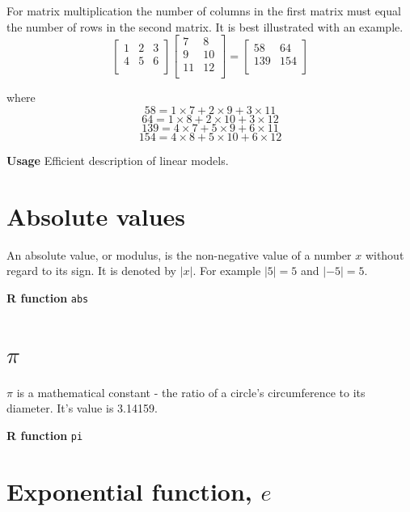 \documentclass[
  oneside]{krantz}
\begin{document}
For matrix multiplication the number of columns in the first matrix must equal the number of rows in the second matrix. It is best illustrated with an example.\\
\[
\left[\begin{array}
{ccc}
1 & 2 & 3 \\
4 & 5 & 6 \\
\end{array}\right] 
\left[\begin{array}
{cc}
7 & 8\\
9 & 10 \\
11 & 12 \\
\end{array}\right] 
= 
\left[\begin{array}
{cc}
58 & 64 \\
139 & 154 \\
\end{array}\right] 
\]

where
\[ 58 = 1 \times 7 + 2 \times 9 + 3 \times 11\]
\[ 64 = 1 \times 8 + 2 \times 10 + 3 \times 12\]
\[ 139 = 4 \times 7 + 5 \times 9 + 6 \times 11\]
\[ 154 = 4 \times 8 + 5 \times 10 + 6 \times 12\]

\textbf{Usage} Efficient description of linear models.

\hypertarget{absolute-values}{%
\section{Absolute values}\label{absolute-values}}

An absolute value, or modulus, is the non-negative value of a number \(x\) without regard to its sign. It is denoted by \(|x|\). For example \(|5| = 5\) and \(|-5| = 5\).

\textbf{R function} \texttt{abs}

\hypertarget{pi}{%
\section{\texorpdfstring{\(\pi\)}{\textbackslash pi}}\label{pi}}

\(\pi\) is a mathematical constant - the ratio of a circle's circumference to its diameter. It's value is 3.14159.

\textbf{R function} \texttt{pi}

\hypertarget{exponential-function-e}{%
\section{\texorpdfstring{Exponential function, \(e\)}{Exponential function, e}}\label{exponential-function-e}}
\end{document}
